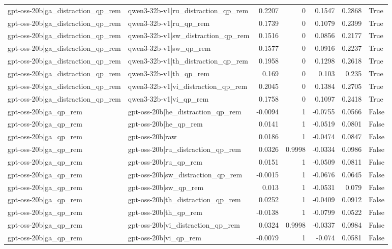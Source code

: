 \begin{table}
\begin{tabular}{l l r r r r l}
gpt-oss-20b|ga_distraction_qp_rem & qwen3-32b-v1|ru_distraction_qp_rem & 0.2207 & 0 & 0.1547 & 0.2868 & True \\
gpt-oss-20b|ga_distraction_qp_rem & qwen3-32b-v1|ru_qp_rem & 0.1739 & 0 & 0.1079 & 0.2399 & True \\
gpt-oss-20b|ga_distraction_qp_rem & qwen3-32b-v1|sw_distraction_qp_rem & 0.1516 & 0 & 0.0856 & 0.2177 & True \\
gpt-oss-20b|ga_distraction_qp_rem & qwen3-32b-v1|sw_qp_rem & 0.1577 & 0 & 0.0916 & 0.2237 & True \\
gpt-oss-20b|ga_distraction_qp_rem & qwen3-32b-v1|th_distraction_qp_rem & 0.1958 & 0 & 0.1298 & 0.2618 & True \\
gpt-oss-20b|ga_distraction_qp_rem & qwen3-32b-v1|th_qp_rem & 0.169 & 0 & 0.103 & 0.235 & True \\
gpt-oss-20b|ga_distraction_qp_rem & qwen3-32b-v1|vi_distraction_qp_rem & 0.2045 & 0 & 0.1384 & 0.2705 & True \\
gpt-oss-20b|ga_distraction_qp_rem & qwen3-32b-v1|vi_qp_rem & 0.1758 & 0 & 0.1097 & 0.2418 & True \\
gpt-oss-20b|ga_qp_rem & gpt-oss-20b|he_distraction_qp_rem & -0.0094 & 1 & -0.0755 & 0.0566 & False \\
gpt-oss-20b|ga_qp_rem & gpt-oss-20b|he_qp_rem & 0.0141 & 1 & -0.0519 & 0.0801 & False \\
gpt-oss-20b|ga_qp_rem & gpt-oss-20b|raw & 0.0186 & 1 & -0.0474 & 0.0847 & False \\
gpt-oss-20b|ga_qp_rem & gpt-oss-20b|ru_distraction_qp_rem & 0.0326 & 0.9998 & -0.0334 & 0.0986 & False \\
gpt-oss-20b|ga_qp_rem & gpt-oss-20b|ru_qp_rem & 0.0151 & 1 & -0.0509 & 0.0811 & False \\
gpt-oss-20b|ga_qp_rem & gpt-oss-20b|sw_distraction_qp_rem & -0.0015 & 1 & -0.0676 & 0.0645 & False \\
gpt-oss-20b|ga_qp_rem & gpt-oss-20b|sw_qp_rem & 0.013 & 1 & -0.0531 & 0.079 & False \\
gpt-oss-20b|ga_qp_rem & gpt-oss-20b|th_distraction_qp_rem & 0.0252 & 1 & -0.0409 & 0.0912 & False \\
gpt-oss-20b|ga_qp_rem & gpt-oss-20b|th_qp_rem & -0.0138 & 1 & -0.0799 & 0.0522 & False \\
gpt-oss-20b|ga_qp_rem & gpt-oss-20b|vi_distraction_qp_rem & 0.0324 & 0.9998 & -0.0337 & 0.0984 & False \\
gpt-oss-20b|ga_qp_rem & gpt-oss-20b|vi_qp_rem & -0.0079 & 1 & -0.074 & 0.0581 & False \\

\end{tabular}
\end{table}
